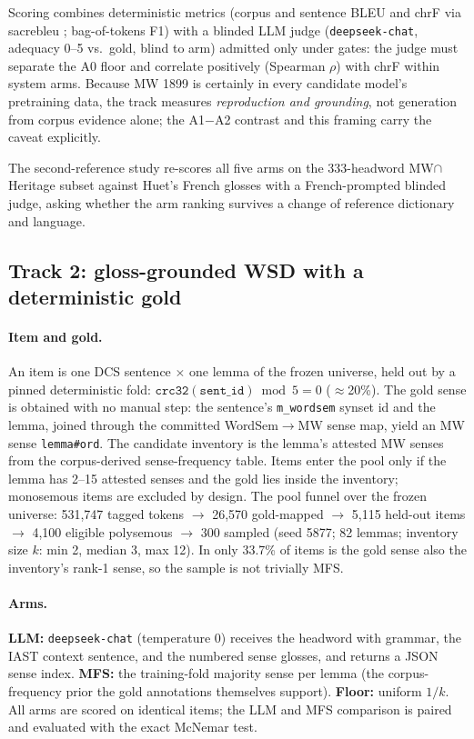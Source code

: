 \documentclass[11pt]{article}
\begin{document}
Scoring combines deterministic metrics (corpus and sentence BLEU and chrF via
sacrebleu \cite{post-2018-statistical}; bag-of-tokens F1) with a blinded LLM judge
(\texttt{deepseek-chat}, adequacy 0--5 vs.\ gold, blind to arm) admitted only under
gates: the judge must separate the A0 floor and correlate positively (Spearman
$\rho$) with chrF within system arms. Because MW 1899 is certainly in every candidate
model's pretraining data, the track measures \emph{reproduction and grounding}, not
generation from corpus evidence alone; the A1$-$A2 contrast and this framing carry the
caveat explicitly.

The second-reference study re-scores all five arms on the 333-headword MW$\cap$Heritage
subset against Huet's French glosses with a French-prompted blinded judge, asking
whether the arm ranking survives a change of reference dictionary and language.

\subsection{Track 2: gloss-grounded WSD with a deterministic gold}

\paragraph{Item and gold.} An item is one DCS sentence $\times$ one lemma of the frozen
universe, held out by a pinned deterministic fold: $\mathtt{crc32(sent\_id)} \bmod 5
= 0$ ($\approx$20\%). The gold sense is obtained with no manual step: the sentence's
\texttt{m\_wordsem} synset id and the lemma, joined through the committed WordSem$\to$MW
sense map, yield an MW sense \texttt{lemma\#ord}. The candidate inventory is the
lemma's attested
MW senses from the corpus-derived sense-frequency table. Items enter the pool only if
the lemma has 2--15 attested senses and the gold lies inside the inventory; monosemous
items are excluded by design. The pool funnel over the frozen universe: 531{,}747
tagged tokens $\rightarrow$ 26{,}570 gold-mapped $\rightarrow$ 5{,}115 held-out items
$\rightarrow$ 4{,}100 eligible polysemous $\rightarrow$ 300 sampled (seed 5877; 82
lemmas; inventory size $k$: min 2, median 3, max 12). In only 33.7\% of items is the
gold sense also the inventory's rank-1 sense, so the sample is not trivially MFS.

\paragraph{Arms.} \textbf{LLM:} \texttt{deepseek-chat} (temperature 0) receives the
headword with grammar, the IAST context sentence, and the numbered sense glosses, and
returns a JSON sense index. \textbf{MFS:} the training-fold majority sense per lemma
(the corpus-frequency prior the gold annotations themselves support). \textbf{Floor:}
uniform $1/k$. All arms are scored on identical items; the LLM and MFS comparison is
paired and evaluated with the exact McNemar test.
\end{document}
